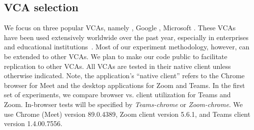 \subsection{VCA selection} 
We focus on three popular VCAs, namely \zoom, Google \meet, Microsoft \teams. These VCAs have been used extensively worldwide over the past year, especially in enterprises and educational institutions~\cite{vca_share}. Most of our experiment methodology, however, can be extended to other VCAs. We plan to make our code public to facilitate replication to other VCAs. %
All VCAs are tested in their native client unless otherwise indicated. Note, the application's ``native client'' refers to the Chrome browser for Meet and the desktop applications for Zoom and Teams. In the first set of experiments, we compare browser vs. client utilization for Teams and Zoom. In-browser tests will be specified by \textit{Teams-chrome} or \textit{Zoom-chrome}. We use Chrome (Meet) version 89.0.4389, Zoom client version 5.6.1, and Teams client version 1.4.00.7556.





